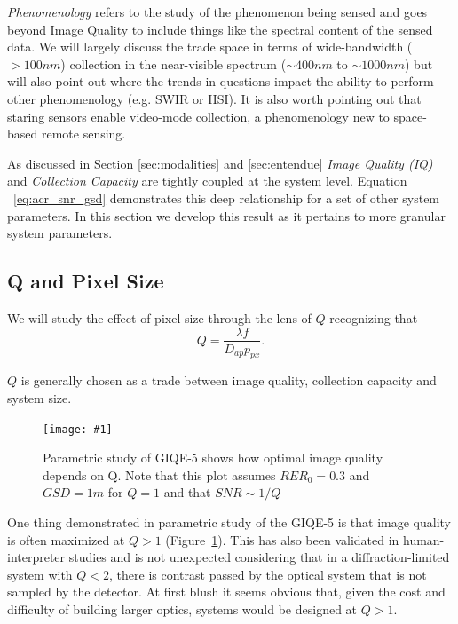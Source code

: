 \documentclass[10pt,journal]{IEEEtran}  %
\newcommand{\includefigure}[3]
{
  \begin{figure}[h!]
  \centering
  \texttt{[image: \#1]}
  \caption[]{#3}
  \label{#2}
  \end{figure}
}
\begin{document}
\emph{Phenomenology} refers to the study of the phenomenon being sensed and goes beyond Image Quality to include things like the spectral content of the sensed data.  We will largely discuss the trade space in terms of wide-bandwidth ($>100 nm$) collection in the near-visible spectrum ($\sim 400 nm$ to $\sim 1000 nm$) but will also point out where the trends in questions impact the ability to perform other phenomenology (e.g. SWIR or HSI).  It is also worth pointing out that staring sensors enable video-mode collection, a phenomenology new to space-based remote sensing.

As discussed in Section \ref{sec:modalities} and \ref{sec:entendue} \emph{Image Quality (IQ)} and \emph{Collection Capacity} are tightly coupled at the system level.  Equation ~\eqref{eq:acr_snr_gsd} demonstrates this deep relationship for a set of other system parameters.  In this section we develop this result as it pertains to more granular system parameters.  

\subsection{Q and Pixel Size}

We will study the effect of pixel size through the lens of $Q$ recognizing that \cite{fiete}
\begin{equation*}
    Q = \frac{\lambda f}{D_{ap} p_{px}}.
\end{equation*}


$Q$ is generally chosen as a trade between image quality, collection capacity and system size.  


\includefigure{figures/Q_iq.pgf}{fig:q_iq}{Parametric study of GIQE-5 shows how optimal image quality depends on Q.  Note that this plot assumes $RER_0 = 0.3$ and $GSD = 1m$ for $Q=1$ and that $SNR \sim 1 / Q$}

One thing demonstrated in parametric study of the GIQE-5 is that image quality is often maximized at $Q>1$ (Figure~\ref{fig:q_iq}).  This has also been validated in human-interpreter studies \cite{fiete_Q_IQ} and is not unexpected considering that in a diffraction-limited system with $Q<2$, there is contrast passed by the optical system that is not sampled by the detector.  At first blush it seems obvious that, given the cost and difficulty of building larger optics, systems would be designed at $Q>1$.  
\end{document}
